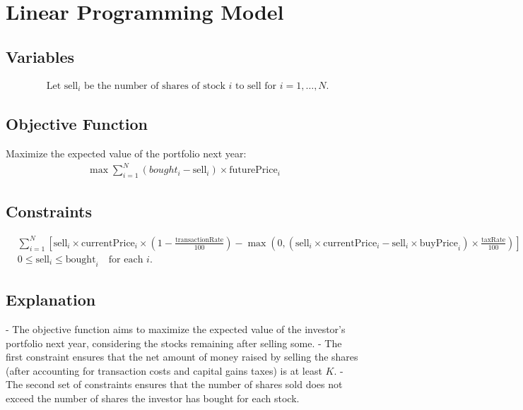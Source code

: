 \documentclass{article}
\begin{document}
\section*{Linear Programming Model}

\subsection*{Variables}
\begin{align*}
    & \text{Let } \text{sell}_i \text{ be the number of shares of stock } i \text{ to sell for } i = 1, \dots, N.
\end{align*}

\subsection*{Objective Function}
Maximize the expected value of the portfolio next year:
\begin{align*}
    \max \sum_{i=1}^{N} (bought_i - \text{sell}_i) \times \text{futurePrice}_i
\end{align*}

\subsection*{Constraints}
\begin{align*}
    & \sum_{i=1}^{N} \left[ \text{sell}_i \times \text{currentPrice}_i \times \left(1 - \frac{\text{transactionRate}}{100}\right) - \max\left(0, (\text{sell}_i \times \text{currentPrice}_i - \text{sell}_i \times \text{buyPrice}_i) \times \frac{\text{taxRate}}{100}\right) \right] \geq K \\
    & 0 \leq \text{sell}_i \leq \text{bought}_i \quad \text{for each } i.
\end{align*}

\subsection*{Explanation}
- The objective function aims to maximize the expected value of the investor's portfolio next year, considering the stocks remaining after selling some.
- The first constraint ensures that the net amount of money raised by selling the shares (after accounting for transaction costs and capital gains taxes) is at least \( K \).
- The second set of constraints ensures that the number of shares sold does not exceed the number of shares the investor has bought for each stock.
\end{document}
